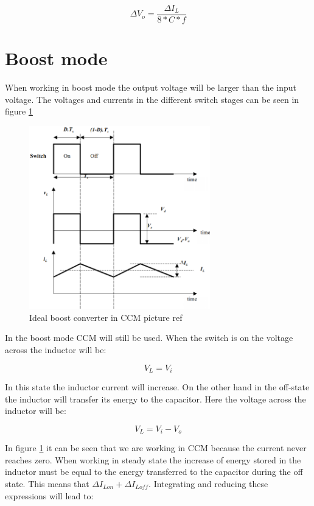 \begin{equation}
\Delta V_o = \frac{\Delta I_L}{8*C*f}
\end{equation}     

\section{Boost mode}
When working in boost mode the output voltage will be larger than the input voltage. The voltages and currents in the different switch stages can be seen in figure \ref{CCM_boost}

\begin{figure}[htbp]
	\begin{center}
		\includegraphics[width=0.7\textwidth]{../Pictures/CCM_boost}
		\caption{Ideal boost converter in CCM picture ref}
		\label{CCM_boost}
	\end{center}	
\end{figure}

In the boost mode CCM will still be used. When the switch is on the voltage across the inductor will be:

\begin{equation}
V_L = V_i
\end{equation}

In this state the inductor current will increase. On the other hand in the off-state the inductor will transfer its energy to the capacitor. Here the voltage across the inductor will be:

\begin{equation}
V_L = V_i-V_o
\end{equation}

In figure \ref{CCM_boost} it can be seen that we are working in CCM because the current never reaches zero. 
When working in steady state the increase of energy stored in the inductor must be equal to the energy transferred to the capacitor during the off state. This means that $\Delta I_{Lon}+\Delta I_{Loff}$. Integrating and reducing these expressions will lead to:

